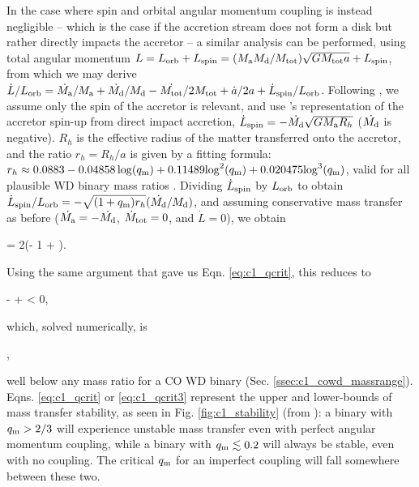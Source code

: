 In the case where spin and orbital angular momentum coupling is instead negligible -- which is the case if the accretion stream does not form a disk but rather directly impacts the accretor \citep{nele+01} -- a similar analysis can be performed, using total angular momentum $L = L_\mrm{orb} + L_\mrm{spin} = (\Ma\Md/\Mtot)\sqrt{G\Mtot a} + L_\mrm{spin}$, from which we may derive $\dot{L}/L_\mrm{orb} = \dot{\Ma}/\Ma + \dot{\Md}/\Md - \dot{\Mtot}/2\Mtot + \dot{a}/2a + \dot{L}_\mrm{spin}/L_\mrm{orb}$.  Following \cite{marsns04}, we assume only the spin of the accretor is relevant, and use \cite{verbr88}'s representation of the accretor spin-up from direct impact accretion, $\dot{L}_\mrm{spin} = -\dot{\Md}\sqrt{G\Ma R_h}$ ($\dot{\Md}$ is negative).  $R_h$ is the effective radius of the matter transferred onto the accretor, and the ratio $r_h = R_h/a$ is given by a fitting formula: $r_h \approx 0.0883 - 0.04858\log(\qm) + 0.11489{\log}^2(\qm) + 0.020475{\log}^3(\qm)$, valid for all plausible WD binary mass ratios \citep{verbr88}.  Dividing $\dot{L}_\mathrm{spin}$ by $L_\mathrm{orb}$ to obtain $\dot{L}_\mrm{spin}/L_\mrm{orb} = -\sqrt{(1 + \qm)r_h}(\dot{\Md}/\Md)$, and assuming conservative mass transfer as before ($\dot{\Ma} = -\dot{\Md}$, $\dot{M}_\mathrm{tot} = 0$, and $\dot{L} = 0$), we obtain

\eqbegin
{} = 2\left(\qm- 1 + \right)\frac{\dot{\Md}}{\Md}.
\label{eq:c1_adotovera2}
\eqend

\noindent Using the same argument that gave us Eqn. \ref{eq:c1_qcrit}, this reduces to

\eqbegin
\qm-  +  < 0,
\label{eq:c1_qcrit2}
\eqend

\noindent which, solved numerically, is

\eqbegin
\qm{},
\label{eq:c1_qcrit3}
\eqend

\noindent well below any mass ratio for a CO WD binary (Sec. \ref{ssec:c1_cowd_massrange}).  Eqns. \ref{eq:c1_qcrit} or \ref{eq:c1_qcrit3} represent the upper and lower-bounds of mass transfer stability, as seen in Fig. \ref{fig:c1_stability} (from \citealt{marsns04}): a binary with $\qm > 2/3$ will experience unstable mass transfer even with perfect angular momentum coupling, while a binary with $\qm \lesssim 0.2$ will always be stable, even with no coupling.  The critical $\qm$ for an imperfect coupling will fall somewhere between these two.

